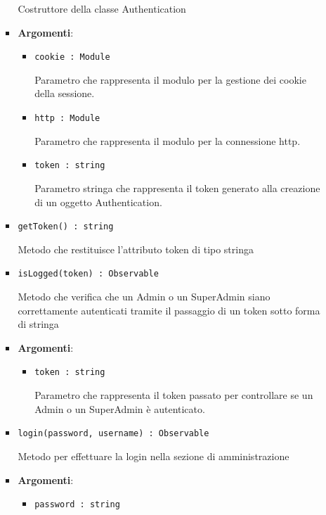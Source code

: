 \documentclass[../DefinizioneDiProdotto.tex]{subfiles}
\begin{document}
\begin{itemize}
\begin{itemize}
\begin{itemize}
	 Costruttore della classe Authentication

	\item \textbf{Argomenti}:
	\begin{itemize}
	\item \texttt{cookie : Module}\

	 Parametro che rappresenta il modulo per la gestione dei cookie della sessione.
	\item \texttt{http : Module}\

	 Parametro che rappresenta il modulo per la connessione http.
	\item \texttt{token : string}\

	 Parametro stringa che rappresenta il token generato alla creazione di un oggetto Authentication.
	\end{itemize}
	\end{itemize}\vspace{0.5em}
	\begin{itemize}
	\item \texttt{getToken() : string}\

	 Metodo che restituisce l'attributo token di tipo stringa
	\end{itemize}\vspace{0.5em}
	\begin{itemize}
	\item \texttt{isLogged(token) : Observable}\

	 Metodo che verifica che un Admin o un SuperAdmin siano correttamente autenticati tramite il passaggio di un token sotto forma di stringa

	\item \textbf{Argomenti}:
	\begin{itemize}
	\item \texttt{token : string}\

	 Parametro che rappresenta il token passato per controllare se un Admin o un SuperAdmin è autenticato.
	\end{itemize}
	\end{itemize}\vspace{0.5em}
	\begin{itemize}
	\item \texttt{login(password, username) : Observable}\

	 Metodo per effettuare la login nella sezione di amministrazione

	\item \textbf{Argomenti}:
	\begin{itemize}
	\item \texttt{password : string}\


\end{itemize}
\end{itemize}
\end{itemize}
\end{itemize}
\end{document}
